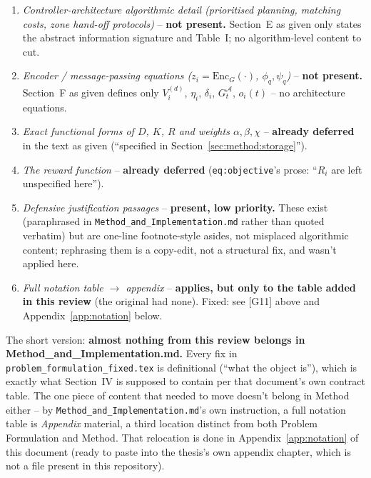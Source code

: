 \documentclass[11pt]{article}
\begin{document}
\begin{enumerate}
  \item \emph{Controller-architecture algorithmic detail (prioritised
    planning, matching costs, zone hand-off protocols)} -- \textbf{not
    present.} Section~E as given only states the abstract information
    signature and Table~I; no algorithm-level content to cut.
  \item \emph{Encoder / message-passing equations
    ($z_i=\mathrm{Enc}_G(\cdot)$, $\phi_q,\psi_q$)} -- \textbf{not present.}
    Section~F as given defines only $V_i^{(d)}$, $\eta_i$, $\delta_i$,
    $G_t^{\mathcal{A}}$, $o_i(t)$ -- no architecture equations.
  \item \emph{Exact functional forms of $D$, $K$, $R$ and weights
    $\alpha,\beta,\chi$} -- \textbf{already deferred} in the text as given
    (``specified in Section~\ref{sec:method:storage}'').
  \item \emph{The reward function} -- \textbf{already deferred}
    (\texttt{eq:objective}'s prose: ``$R_i$ are left unspecified here'').
  \item \emph{Defensive justification passages} -- \textbf{present, low
    priority.} These exist (paraphrased in
    \texttt{Method\_and\_Implementation.md} rather than quoted verbatim) but
    are one-line footnote-style asides, not misplaced algorithmic content;
    rephrasing them is a copy-edit, not a structural fix, and wasn't applied
    here.
  \item \emph{Full notation table $\to$ appendix} -- \textbf{applies, but
    only to the table added in this review} (the original had none). Fixed:
    see [G11] above and Appendix~\ref{app:notation} below.
\end{enumerate}

The short version: \textbf{almost nothing from this review belongs in
Method\_and\_Implementation.md.} Every fix in
\texttt{problem\_formulation\_fixed.tex} is definitional (``what the object
is''), which is exactly what Section~IV is supposed to contain per that
document's own contract table. The one piece of content that needed to move
doesn't belong in Method either -- by \texttt{Method\_and\_Implementation.md}'s
own instruction, a full notation table is \emph{Appendix} material, a third
location distinct from both Problem Formulation and Method. That relocation
is done in Appendix~\ref{app:notation} of this document (ready to paste into
the thesis's own appendix chapter, which is not a file present in this
repository).
\end{document}
